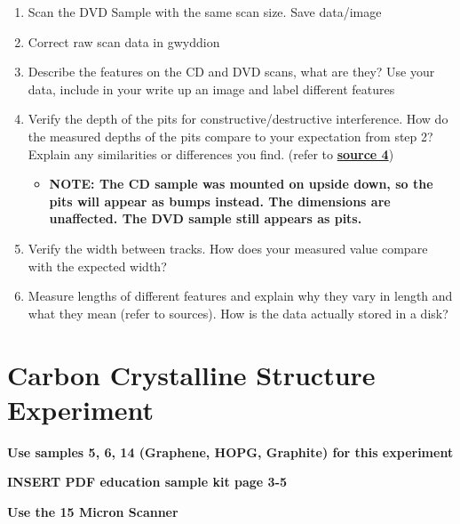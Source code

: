 \documentclass{../lab}
\begin{document}
\begin{enumerate}
    \item Scan the DVD Sample with the same scan size.  Save data/image

    \item Correct raw scan data in gwyddion

    \item Describe the features on the CD and DVD scans, what are they? Use your data, include in your write up an image and label different features

    \item Verify the depth of the pits for constructive/destructive interference. How do the measured depths of the pits compare to your expectation from step 2?  Explain any similarities or differences you find.  (refer to \href{http://www.scientificamerican.com/article/how-do-rewriteable-cds-wo/}{\textbf{source 4}})

    \begin{itemize}
        \item ​​\textbf{NOTE: The CD sample was mounted on upside down, so the pits will appear as bumps instead.  The dimensions are unaffected.  The DVD sample still appears as pits.}

    \end{itemize}

    \item Verify the width between tracks. How does your measured value compare with the expected width?

    \item Measure lengths of different features and explain why they vary in length and what they mean (refer to sources).  How is the data actually stored in a disk?

\end{enumerate}

\section{Carbon Crystalline Structure Experiment}

\textbf{Use samples 5, 6, 14 (Graphene, HOPG, Graphite) for this experiment}

\textbf{INSERT PDF education sample kit page 3-5}

\textbf{Use the 15 Micron Scanner }
\end{document}
